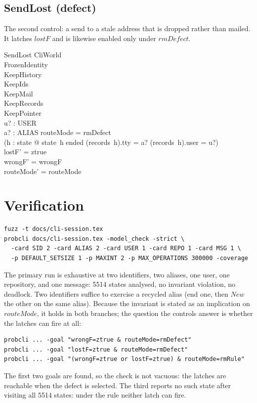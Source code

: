 \documentclass[a4paper,10pt,fleqn]{article}
\begin{document}
\subsection{SendLost (defect)}

The second control: a send to a stale address that is dropped rather
than mailed.  It latches $lostF$ and is likewise enabled only under
$rmDefect$.

\begin{schema}{SendLost}
  \Delta CliWorld \\
  FrozenIdentity \\
  KeepHistory \\
  KeepIds \\
  KeepMail \\
  KeepRecords \\
  KeepPointer \\
  u? : USER \\
  a? : ALIAS
  \where
  routeMode = rmDefect \\
  \lnot (\exists h : \dom state @
    state~h \neq ended
      \land (records~h).tty = a?
      \land (records~h).user = u?) \\
  lostF' = ztrue \\
  wrongF' = wrongF \\
  routeMode' = routeMode
\end{schema}

\section{Verification}

\begin{verbatim}
fuzz -t docs/cli-session.tex
probcli docs/cli-session.tex -model_check -strict \
  -card SID 2 -card ALIAS 2 -card USER 1 -card REPO 1 -card MSG 1 \
  -p DEFAULT_SETSIZE 1 -p MAXINT 2 -p MAX_OPERATIONS 300000 -coverage
\end{verbatim}

The primary run is exhaustive at two identifiers, two aliases, one user,
one repository, and one message: 5514 states analysed, no invariant
violation, no deadlock.  Two identifiers suffice to exercise a recycled alias (end one,
then $New$ the other on the same alias).  Because the invariant is
stated as an implication on $routeMode$, it holds in both branches; the
question the controls answer is whether the latches can fire at all:

\begin{verbatim}
probcli ... -goal "wrongF=ztrue & routeMode=rmDefect"
probcli ... -goal "lostF=ztrue & routeMode=rmDefect"
probcli ... -goal "(wrongF=ztrue or lostF=ztrue) & routeMode=rmRule"
\end{verbatim}

The first two goals are found, so the check is not vacuous: the latches
are reachable when the defect is selected.  The third reports no such
state after visiting all 5514 states: under the rule neither latch can
fire.
\end{document}
